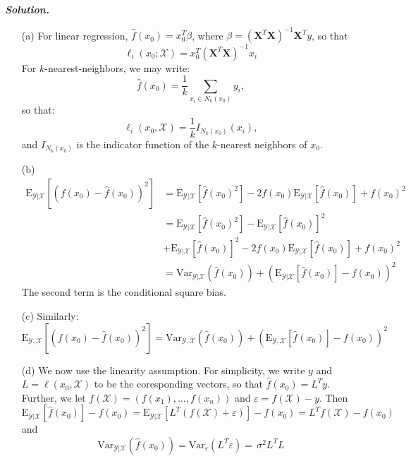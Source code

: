 \documentclass[12pt]{article}
\def\var{\text{Var}}
\def\eps{\varepsilon}
\def\bX{\textbf{X}}
\def\E{\text{E}}
\newenvironment{solution}[1][\it{Solution}]{\textbf{#1. } }{\vspace{.5cm}}
\begin{document}
\begin{solution}\begin{enumerate}
    \item [(a)]  For linear regression, $\hat{f}(x_0) = x_0^T \beta$, where $\beta = (\bX^T\bX)^{-1}\bX^T y$, so that $$\ell_i(x_0; \mathcal{X}) = x_0^T(\bX^T\bX)^{-1}x_i$$
    For $k$-nearest-neighbors, we may write:
    $$\hat{f}(x_0) = \frac{1}{k}\sum_{x_i \in N_k(x_0)} y_i,$$
    so that:
    $$\ell_i(x_0, \mathcal{X}) = \frac{1}{k} I_{N_k(x_0)}(x_i),$$
    and $I_{N_k(x_0)}$ is the indicator function of the $k$-nearest neighbors of $x_0$.

    \item [(b)]
    $$\begin{aligned}\E_{\mathcal{Y}| \mathcal{X}}[(f(x_0) - \hat{f}(x_0))^2] &= \E_{\mathcal{Y}| \mathcal{X}}[\hat{f}(x_0)^2] -2 f(x_0)\E_{\mathcal{Y}| \mathcal{X}}[\hat{f}(x_0)] + f(x_0)^2 \\
    &= \E_{\mathcal{Y}| \mathcal{X}}[\hat{f}(x_0)^2]- \E_{\mathcal{Y}| \mathcal{X}}[\hat{f}(x_0)]^2\\
    &+ \E_{\mathcal{Y}| \mathcal{X}}[\hat{f}(x_0)]^2 -2 f(x_0)\E_{\mathcal{Y}| \mathcal{X}}[\hat{f}(x_0)] + f(x_0)^2 \\
    &= \var_{\mathcal{Y}|\mathcal{X}}(\hat{f}(x_0)) + (\E_{\mathcal{Y}| \mathcal{X}}[\hat{f}(x_0)]- f(x_0))^2 
    \end{aligned}$$
    The second term is the conditional square bias. 
    \item [(c)] Similarly:
    $$\E_{\mathcal{Y}, \mathcal{X}}[(f(x_0) - \hat{f}(x_0))^2]  = \var_{\mathcal{Y},\mathcal{X}}(\hat{f}(x_0)) + (\E_{\mathcal{Y}, \mathcal{X}}[\hat{f}(x_0)]- f(x_0))^2 $$

    \item [(d)] We now use the linearity assumption. For simplicity, we write $y$ and $L = \ell(x_0, \mathcal{X})$ to be the coresponding vectors, so that $\hat{f}(x_0) = L^T y$. Further, we let $f(\mathcal{X}) = (f(x_1), \dots, f(x_n))$ and $\eps = f(\mathcal{X})-y$. Then
    $$\E_{\mathcal{Y}| \mathcal{X}}[\hat{f}(x_0)]- f(x_0) =  \E_{\mathcal{Y}| \mathcal{X}}[L^T(f(\mathcal{X})+\eps)]- f(x_0) = L^Tf(\mathcal{X})-f(x_0)$$
    and
    $$\var_{\mathcal{Y}|\mathcal{X}}(\hat{f}(x_0)) = \var_{\eps}(L^T\eps) = \, \sigma^2 L^T L $$

    
\end{enumerate}
\end{solution}
\end{document}
